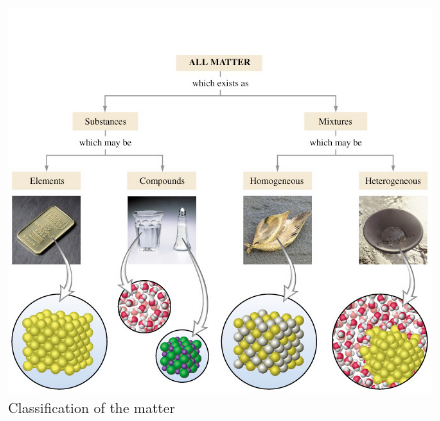 \documentclass[main.tex]{subfiles}
\begin{document}
\begin{description}
\begin{figure}[h] %
\includegraphics[width=1\linewidth,scale=0.5]{chapter0.5/figure1-3}
\caption{Classification of the matter}
\end{figure}


\end{description}
\end{document}
